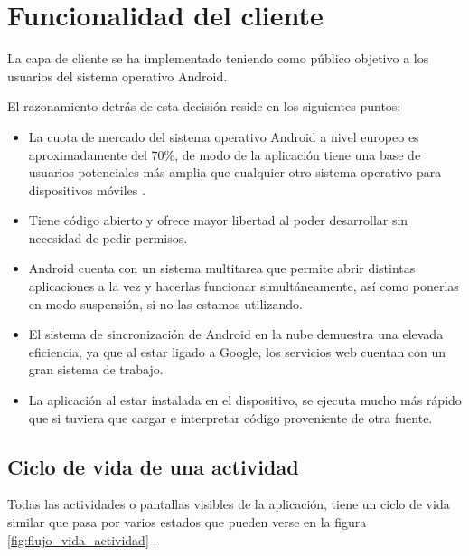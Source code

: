 \section{Funcionalidad del cliente}
La capa de cliente se ha implementado teniendo como público objetivo a los usuarios del sistema operativo Android.

El razonamiento detrás de esta decisión reside en los siguientes puntos:
\begin{itemize}
    \item La cuota de mercado del sistema operativo Android a nivel europeo es aproximadamente del 70\%, de modo de la aplicación tiene una base de usuarios potenciales más amplia que cualquier otro sistema operativo para dispositivos móviles \cite{gs_statscounter}.
    \item Tiene código abierto y ofrece mayor libertad al poder desarrollar sin necesidad de pedir permisos.
    \item Android cuenta con un sistema multitarea que permite abrir distintas aplicaciones a la vez y hacerlas funcionar simultáneamente, así como ponerlas en modo suspensión, si no las estamos utilizando.
    \item El sistema de sincronización de Android en la nube demuestra una elevada eficiencia, ya que al estar ligado a Google, los servicios web cuentan con un gran sistema de trabajo.
    \item La aplicación al estar instalada en el dispositivo, se ejecuta mucho más rápido que si tuviera que cargar e interpretar código proveniente de otra fuente.
\end{itemize}

\subsection{Ciclo de vida de una actividad}
Todas las actividades o pantallas visibles de la aplicación, tiene un ciclo de vida similar que pasa por varios estados que pueden verse en la figura \ref{fig:flujo_vida_actividad} .


